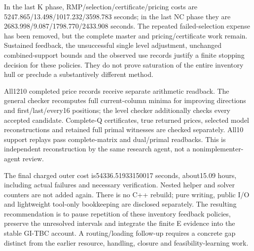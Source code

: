 In the last K phase, RMP/selection/certificate/pricing costs are
5247.865/13.498/1017.232/3598.783 seconds; in the last NC phase they are
2683.998/9.087/1798.770/2433.908 seconds. The repeated failed-selection
expense has been removed, but the complete master and pricing/certificate
work remain. Sustained feedback, the unsuccessful single level adjustment,
unchanged combined-support bounds and the observed use records justify a
finite stopping decision for these policies. They do not prove saturation
of the entire inventory hull or preclude a substantively different method.

All1210 completed price records receive separate arithmetic readback.
The general checker recomputes full current-column minima for improving
directions and first/last/every16 positions; the level checker additionally
checks every accepted candidate. Complete-Q certificates, true returned
prices, selected model reconstructions and retained full primal witnesses
are checked separately. All10 support replays pass complete-matrix and
dual/primal readbacks. This is independent reconstruction by the same
research agent, not a nonimplementer-agent review.

The final charged outer cost is54336.51933150017 seconds, about15.09 hours,
including actual failures and necessary verification. Nested helper and
solver counters are not added again. There is no C++ rebuild; pure writing,
public I/O and lightweight tool-only bookkeeping are disclosed separately.
The resulting recommendation is to pause repetition of these inventory
feedback policies, preserve the unresolved intervals and integrate the
finite E evidence into the stable GI-TBC account. A routing/loading
follow-up requires a concrete gap distinct from the earlier resource,
handling, closure and feasibility-learning work.

